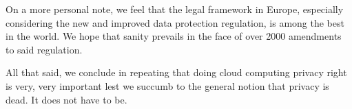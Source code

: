 \documentclass[11pt]{article}
\begin{document}
On a more personal note, we feel that the legal framework in Europe, especially considering the new and improved data protection regulation, is among the best in the world. We hope that sanity prevails in the face of over 2000 amendments to said regulation.

All that said, we conclude in repeating that doing cloud computing privacy right is very, very important lest we succumb to the general notion that privacy is dead. It does not have to be.


{}

\end{document}
